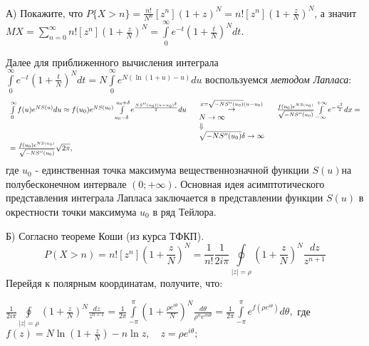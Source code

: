 \begin{ordre}

А) Покажите, что $P\{X>n\}=\frac{n!}{N^n}\left[ {z^n} \right]\left( {1+z} 
\right)^N=n!\left[ {z^n} \right]\left( {1+\frac{z}{N}} \right)^N$, а значит 
$MX=\sum\limits_{n=0}^\infty {n!\left[ {z^n} \right]} \left( {1+\frac{z}{N}} 
\right)^N=\int\limits_0^\infty {e^{-t}\left( {1+\frac{t}{N}} \right)^Ndt} $. 

Далее для приближенного вычисления интеграла $\int\limits_0^\infty 
{e^{-t}\left( {1+\frac{t}{N}} \right)^Ndt} =N\int\limits_0^\infty 
{e^{N\left( {\ln (1+u)-u} \right)}du} $ воспользуемся \textit{методом Лапласа}:
\[
\begin{array}{l}
 \int\limits_0^\infty {f(u)e^{NS(u)}du} \approx f(u_0 )e^{NS(u_0 
)}\int\limits_{u_0 -\delta }^{u_0 +\delta } {e^{\frac{NS''(u_0 )(u-u_0 
)^2}{2}}} du\quad \mathop {\mathop \to \limits^{x=\sqrt {-NS''(u_0 )} (u-u_0 
)} }\limits_{{\begin{array}{*{20}c}
 {N\to \infty } \hfill \\
 \Downarrow \hfill \\
 {\sqrt {-NS''(u_0 )} \delta \to \infty } \hfill \\
\end{array} }} \quad \frac{f(u_0 )e^{NS(u_0 )}}{\sqrt {-NS''(u_0 )} 
}\int\limits_{-\infty }^{+\infty } {e^{-\frac{x^2}{2}}} dx= \\ 
 =\frac{f(u_0 )e^{NS(u_0 )}}{\sqrt {-NS''(u_0 )} }\sqrt {2\pi } , \\ 
 \end{array}
\]
где $u_0 $ - единственная точка максимума вещественнозначной функции 
$S(u)$на полубесконечном интервале $(0;+\infty )$. Основная идея 
асимптотического представления интеграла Лапласа заключается в представлении 
функции $S(u)$ в окрестности точки максимума $u_0 $ в ряд Тейлора.

Б) Согласно теореме Коши (из курса ТФКП). 
\[
P(X>n)=n!\left[ {z^n} \right]\left( {1+\frac{z}{N}} 
\right)^N=\frac{1}{n!}\frac{1}{2i\pi }\oint\limits_{\vert z\vert =\rho } 
{\left( {1+\frac{z}{N}} \right)^N\frac{dz}{z^{n+1}}} 
\]
Перейдя к полярным координатам, получите, что:

$\frac{1}{2i\pi }\oint\limits_{\vert z\vert =\rho } {\left( {1+\frac{z}{N}} 
\right)^N\frac{dz}{z^{n+1}}} =\frac{1}{2\pi }\int\limits_{-\pi }^\pi {\left( 
{1+\frac{\rho e^{i\theta }}{N}} \right)^N\frac{d\theta }{\rho ^ne^{in\theta 
}}} =\frac{1}{2\pi }\int\limits_{-\pi }^\pi {e^{f(\rho e^{i\theta })}d\theta 
} ,$ где $f(z)=N\ln \left( {1+\frac{z}{N}} \right)-n\ln z,\quad z=\rho 
e^{i\theta };$


\end{ordre}
